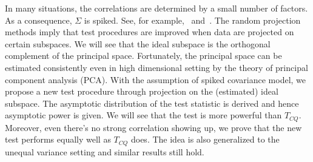 \documentclass[review]{elsarticle}
\theoremstyle{plain}
\theoremstyle{definition}
\theoremstyle{remark}
\begin{document}
In many situations, the correlations are determined by a small number of factors.
As a consequence, $\Sigma$ is spiked. See, for example,~\cite{Cai2012Sparse} and~\cite{Shen2013Consistency}.
The random projection methods imply that test procedures are improved when data are projected on certain subspaces.
We will see that the ideal subspace is the orthogonal complement of the principal space.
Fortunately, the principal space can be estimated consistently even in high dimensional setting by the theory of principal component analysis (PCA).
With the assumption of spiked covariance model, we propose a new test procedure through projection on the (estimated) ideal subspace.  
The asymptotic distribution of the test statistic is derived and hence asymptotic power is given.
We will see that the test is more powerful than $T_{CQ}$.
Moreover, even there's no strong correlation showing up, we prove that the new test performs equally well as $T_{CQ}$ does. The idea is also generalized to the unequal variance setting and similar results still hold.



\end{document}
